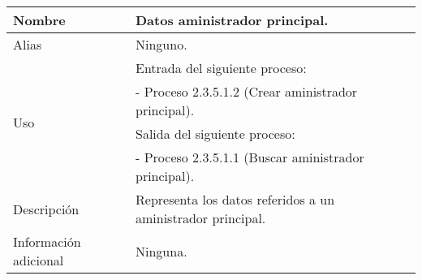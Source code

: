 \begin{center}
  \begin{tabular}{| l | p{9cm} |}
    \hline
    Nombre & \textbf{Datos aministrador principal}.\\
    \hline
    Alias & Ninguno.\\
    \hline
    \multirow{4}{*}{Uso} & Entrada del siguiente proceso:\\
                         & - Proceso 2.3.5.1.2 (Crear aministrador principal).\\
                         & Salida del siguiente proceso:\\
                         & - Proceso 2.3.5.1.1 (Buscar aministrador principal).\\
    \hline
    Descripción & Representa los datos referidos a un aministrador principal.\\
    \hline
    Información adicional & Ninguna.\\
    \hline
  \end{tabular}
\end{center}

